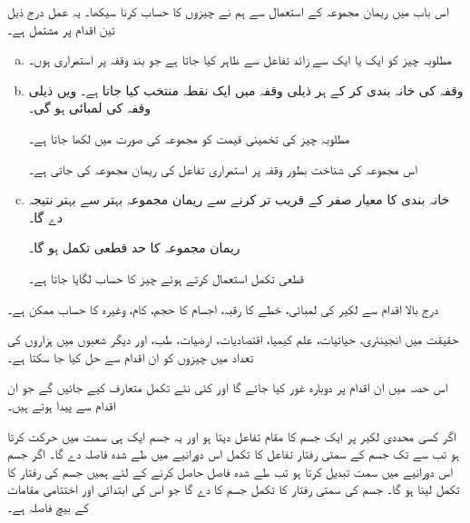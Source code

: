 
اس باب میں ریمان مجموعہ کے استعمال سے ہم نے چیزوں کا حساب کرنا سیکھا۔ یہ عمل درج ذیل تین اقدام پر مشتمل ہے۔
\begin{enumerate}[a.]
\item
مطلوبہ چیز کو ایک یا ایک سے زائد تفاعل سے ظاہر کیا جاتا ہے جو بند وقفہ  پر استمراری ہوں۔
\item
وقفہ  کی خانہ بندی کر کے ہر ذیلی وقفہ میں ایک نقطہ  منتخب کیا جاتا ہے۔  ویں ذیلی وقفہ کی لمبائی   ہو گی۔ 

مطلوبہ چیز کی تخمینی قیمت کو مجموعہ کی صورت میں لکھا جاتا ہے۔

اس مجموعہ کی شناخت بطور وقفہ  پر استمراری تفاعل کی ریمان مجموعہ کی جاتی ہے۔
\item
خانہ بندی کا معیار صفر کے قریب تر کرنے سے ریمان مجموعہ بہتر سے بہتر نتیجہ دے گا۔

ریمان مجموعہ کا حد قطعی تکمل ہو گا۔

قطعی تکمل استعمال کرتے ہوئے چیز کا حساب لگایا جاتا ہے۔
\end{enumerate}

درج بالا اقدام سے لکیر کی لمبائی، خطے کا رقبہ، اجسام کا حجم، کام، وغیرہ کا حساب ممکن ہے۔

حقیقت میں انجینئری، حیاتیات، علم کیمیا، اقتصادیات، ارضیات، طب، اور دیگر شعبوں میں ہزاروں کی تعداد میں چیزوں کو ان اقدام سے حل کیا جا سکتا ہے۔

اس حصہ میں ان اقدام پر دوبارہ غور کیا جائے گا اور کئی نئے تکمل متعارف کیے جائیں گے جو ان اقدام سے پیدا ہوتے ہیں۔

اگر کسی محددی لکیر پر ایک جسم کا مقام تفاعل  دیتا ہو اور یہ جسم ایک ہی سمت میں حرکت کرتا ہو تب    سے  تک جسم کے سمتی رفتار تفاعل  کا تکمل  اس دورانیے میں طے شدہ فاصلہ دے گا۔ اگر جسم اس دورانیے میں سمت تبدیل کرتا ہو تب طے شدہ فاصل حاصل کرنے کے لئے ہمیں جسم کی رفتار  کا تکمل لینا ہو گا۔ جسم کی سمتی رفتار کا تکمل جسم کا   دے گا جو اس کی ابتدائی اور اختتامی مقامات کے بیچ فاصلہ ہے۔

